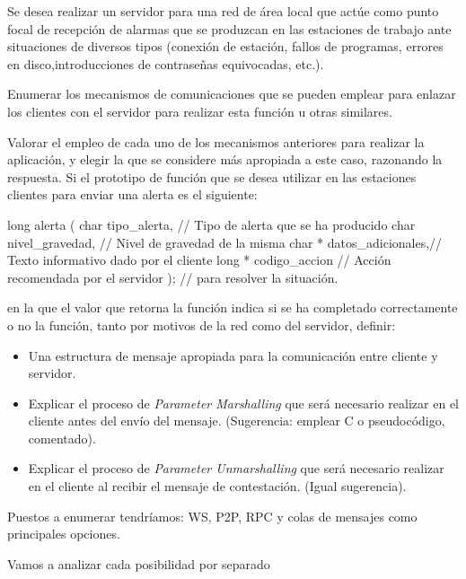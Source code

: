   \begin{problem}[13]
  Se desea realizar un servidor para una red de área local que actúe como
punto focal de recepción de alarmas que se produzcan en las estaciones de
trabajo ante situaciones de diversos tipos (conexión de estación, fallos de
programas, errores en disco,introducciones de contraseñas equivocadas, etc.).

    \ppart Enumerar los mecanismos de comunicaciones que se pueden emplear para
enlazar los clientes con el servidor para realizar esta función u otras
similares.

    \ppart Valorar el empleo de cada uno de los mecanismos anteriores para realizar la
aplicación, y elegir la que se considere más apropiada a este caso, razonando
la respuesta.
    \ppart Si el prototipo de función que se desea utilizar en las estaciones clientes
para enviar una alerta es el siguiente:
\begin{verbnobox}[\small]
long alerta (
char tipo_alerta,      // Tipo de alerta que se ha producido
char nivel_gravedad,   // Nivel de gravedad de la misma
char * datos_adicionales,// Texto informativo dado por el cliente
long * codigo_accion   // Acción recomendada por el servidor
);                     //  para resolver la situación.
\end{verbnobox}
    en la que el valor que retorna la función indica si se ha completado
correctamente o no la función, tanto por motivos de la red como del servidor,
definir:
    \begin{itemize}
      \item Una estructura de mensaje apropiada para la comunicación entre cliente y
servidor.
      \item Explicar el proceso de \textit{Parameter Marshalling} que será necesario
realizar en el cliente antes del envío del mensaje. (Sugerencia: emplear C o
pseudocódigo, comentado).
      \item Explicar el proceso de \textit{Parameter Unmarshalling} que será necesario
realizar en el cliente al recibir el mensaje de contestación. (Igual sugerencia).
    \end{itemize}
      \solution

      \yoP

      \spart

      Puestos a enumerar tendríamos: WS, P2P, RPC y colas de mensajes como principales opciones.

      \spart

      Vamos a analizar cada posibilidad por separado


\end{problem}
